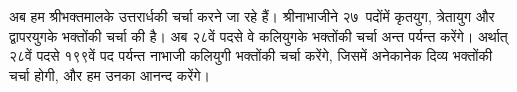 



\begin{sloppypar}\justifying{}
अब हम श्रीभक्तमालके उत्तरार्धकी चर्चा करने जा रहे हैं। श्रीनाभाजीने २७~पदोंमें कृतयुग, त्रेतायुग और द्वापरयुगके भक्तोंकी चर्चा की है। अब २८वें पदसे वे कलियुगके भक्तोंकी चर्चा अन्त पर्यन्त करेंगे। अर्थात् २८वें पदसे १९९वें पद पर्यन्त नाभाजी कलियुगी भक्तोंकी चर्चा करेंगे, जिसमें अनेकानेक दिव्य भक्तोंकी चर्चा होगी, और हम उनका आनन्द करेंगे।
\end{sloppypar}


